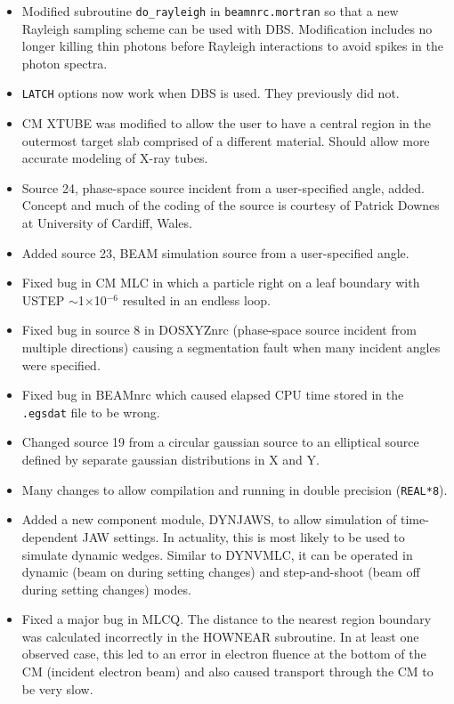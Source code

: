 \documentclass[12pt,twoside]{article}
\begin{document}
\begin{itemize}

\item Modified subroutine {\tt do\_rayleigh} in {\tt beamnrc.mortran} so that
a new Rayleigh sampling scheme can be used with DBS.  Modification includes no longer
killing thin photons before Rayleigh interactions to avoid spikes in the photon
spectra.

\item {\tt LATCH} options now work when DBS is used.  They previously did not.

\item CM XTUBE was modified to allow the user to have a central region in the outermost
target slab comprised of a different material.  Should allow more accurate modeling of
X-ray tubes.

\item Source 24, phase-space source incident from a user-specified angle, added.  Concept
and much of the coding of the source is courtesy of Patrick Downes at University of Cardiff, Wales.

\item Added source 23, BEAM simulation source from a user-specified angle.

\item Fixed bug in CM MLC in which a particle right on a leaf boundary with USTEP $\sim$1$\times$10$^{-6}$ resulted in an endless loop.

\item Fixed bug in source 8 in DOSXYZnrc (phase-space source incident from multiple directions)
causing a segmentation fault when many incident angles were specified.

\item Fixed bug in BEAMnrc which caused elapsed CPU time stored in the {\tt .egsdat}
file to be wrong.

\item Changed source 19 from a circular gaussian source to an elliptical source defined
by separate gaussian distributions in X and Y.

\item Many changes to allow compilation and running in double precision ({\tt REAL*8}).

\item Added a new component module, DYNJAWS, to allow simulation of time-dependent
JAW settings.  In actuality, this is most likely to be used to simulate dynamic wedges.
Similar to DYNVMLC, it can be operated in dynamic (beam on during setting changes) and
step-and-shoot (beam off during setting changes) modes.

\item Fixed a major bug in MLCQ.  The distance to the nearest region boundary was calculated
incorrectly in the HOWNEAR subroutine.  In at least one observed case, this led to an error
in electron fluence at the bottom of the CM (incident electron beam) and also caused
transport through the CM to be very slow.
\end{itemize}
\end{document}

